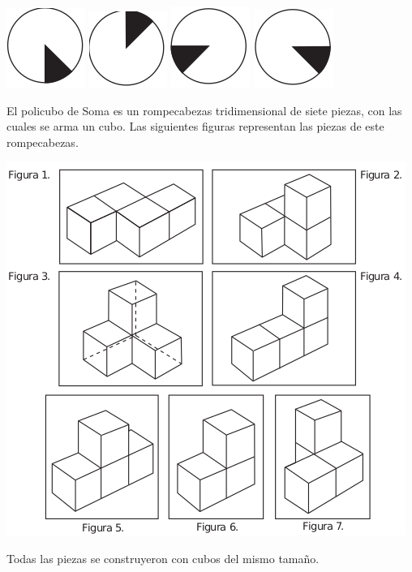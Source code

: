 \documentclass[addpoints]{exam}
\begin{document}
\begin{multicols}{2}
\begin{questions}
\begin{oneparchoices}
\choice \includegraphics[scale=.3]{Images/Pantallazo-29.png} 
\choice \includegraphics[scale=.3]{Images/Pantallazo-30.png} 
\CorrectChoice \includegraphics[scale=.3]{Images/Pantallazo-31.png} 
\choice \includegraphics[scale=.3]{Images/Pantallazo-32.png} 
\end{oneparchoices}
\question El policubo de Soma es un rompecabezas tridimensional de siete piezas, con las cuales se arma un cubo. Las siguientes figuras representan las piezas de este rompecabezas.
\begin{center}
\includegraphics[scale=.3]{Images/Pantallazo-33.png} 
\end{center}
Todas las piezas se construyeron con cubos del mismo tamaño.


\end{questions}
\end{multicols}
\end{document}
